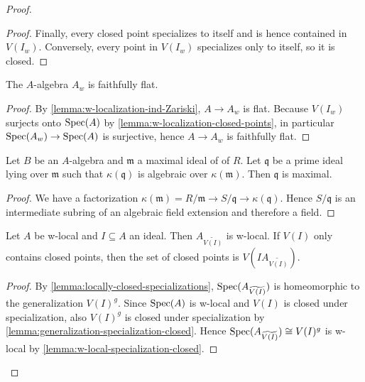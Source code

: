 \begin{proof}
\begin{proof}
    Finally, every closed point specializes to itself and is hence contained in $V(I_{w})$. Conversely,
    every point in $V(I_{w})$ specializes only to itself, so it is closed.
\end{proof}

\begin{lemma}
    The $A$-algebra $A_w$ is faithfully flat.
    \label{lemma:w-localization-faithfully-flat}
\end{lemma}

\begin{proof}
    By \ref{lemma:w-localization-ind-Zariski}, $A \to A_w$ is flat. Because
    $V(I_w)$ surjects onto $\mathrm{Spec}(A)$ by \ref{lemma:w-localization-closed-points},
    in particular $\mathrm{Spec}(A_w) \to \mathrm{Spec}(A)$ is surjective, hence
    $A \to A_w$ is faithfully flat.
\end{proof}

\begin{lemma}[\stacksproject{00GA}]
    Let $B$ be an $A$-algebra and $\mathfrak{m}$ a maximal ideal of of $R$. Let
    $\mathfrak{q}$ be a prime ideal lying over $\mathfrak{m}$ such that
    $\kappa(\mathfrak{q})$ is algebraic over $\kappa(\mathfrak{m})$. Then
    $\mathfrak{q}$ is maximal.
    \label{lemma:prime-over-maximal-algebraic}
\end{lemma}

\begin{proof}
    We have a factorization $\kappa(\mathfrak{m}) = R / \mathfrak{m} \to S / \mathfrak{q} \to \kappa(\mathfrak{q})$.
    Hence $S / \mathfrak{q}$ is an intermediate subring of an algebraic field extension and therefore
    a field.
\end{proof}

\begin{lemma}
    Let $A$ be w-local and $I \subseteq A$ an ideal. Then
    $A_{\widetilde{V(I)}}$ is w-local. If $V(I)$ only contains closed points, then
    the set of closed points is $V(IA_{\widetilde{V(I)}})$.
    \label{lemma:w-local-tilde-w-local}
\end{lemma}

\begin{proof}
    By \ref{lemma:locally-closed-specializations}, $\mathrm{Spec}(A_{\widetilde{V(I)}})$ is homeomorphic
    to the generalization $V(I)^g$. Since $\mathrm{Spec}(A)$ is w-local and $V(I)$ is closed
    under specialization, also $V(I)^g$ is closed under specialization by
    \ref{lemma:generalization-specialization-closed}. Hence
    $\mathrm{Spec}(A_{\widetilde{V(I)}}) \cong V(I)^g$ is w-local by \ref{lemma:w-local-specialization-closed}.


\end{proof}
\end{proof}
